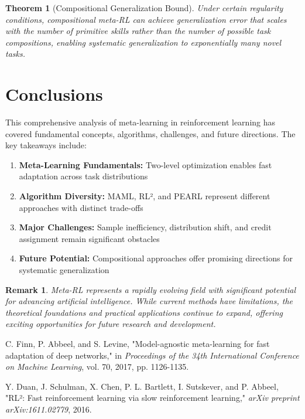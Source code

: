 \documentclass[12pt]{article}
\newtheorem{theorem}{Theorem}
\newtheorem{remark}{Remark}
\begin{document}
{{			\begin{theorem}[Compositional Generalization Bound]
			Under certain regularity conditions, compositional meta-RL can achieve generalization error that scales with the number of primitive skills rather than the number of possible task compositions, enabling systematic generalization to exponentially many novel tasks.
			\end{theorem}
			
			\section{Conclusions}
			
			This comprehensive analysis of meta-learning in reinforcement learning has covered fundamental concepts, algorithms, challenges, and future directions. The key takeaways include:
			
			\begin{enumerate}
				\item \textbf{Meta-Learning Fundamentals:} Two-level optimization enables fast adaptation across task distributions
				\item \textbf{Algorithm Diversity:} MAML, RL², and PEARL represent different approaches with distinct trade-offs
				\item \textbf{Major Challenges:} Sample inefficiency, distribution shift, and credit assignment remain significant obstacles
				\item \textbf{Future Potential:} Compositional approaches offer promising directions for systematic generalization
			\end{enumerate}
			
			\begin{remark}
			Meta-RL represents a rapidly evolving field with significant potential for advancing artificial intelligence. While current methods have limitations, the theoretical foundations and practical applications continue to expand, offering exciting opportunities for future research and development.
			\end{remark}
			
			\begin{thebibliography}{9}
				
				C. Finn, P. Abbeel, and S. Levine, "Model-agnostic meta-learning for fast adaptation of deep networks," in \textit{Proceedings of the 34th International Conference on Machine Learning}, vol. 70, 2017, pp. 1126-1135.
				
				Y. Duan, J. Schulman, X. Chen, P. L. Bartlett, I. Sutskever, and P. Abbeel, "RL²: Fast reinforcement learning via slow reinforcement learning," \textit{arXiv preprint arXiv:1611.02779}, 2016.
				

\end{thebibliography}}}
\end{document}
